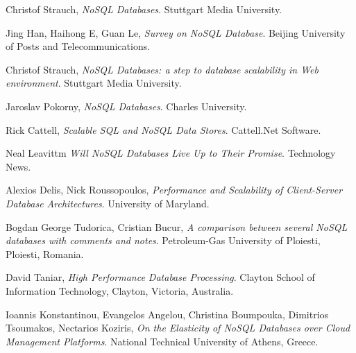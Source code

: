 \documentclass[times, 10pt,twocolumn]{article}
\newcounter{firstbib}
\begin{document}
\begin{thebibliography}{9}  

\setcounter{enumiv}{\value{firstbib}}

  	  Christof Strauch, 
      \emph{NoSQL Databases}. Stuttgart Media University.
      
      
  	  Jing Han, Haihong E, Guan Le,
      \emph{Survey on NoSQL Database}. Beijing University of Posts and Telecommunications.
      
  	  Christof Strauch, 
      \emph{NoSQL Databases: a step to database scalability in Web environment}. Stuttgart Media University.
      
  	   Jaroslav Pokorny, 
      \emph{NoSQL Databases}. Charles University.
      
  	  Rick Cattell, 
      \emph{Scalable SQL and NoSQL Data Stores}. Cattell.Net Software.
      
      
  	  Neal Leavittm 
      \emph{Will NoSQL Databases Live Up to Their Promise}. Technology News.
      
  	  Alexios Delis, Nick Roussopoulos, 
      \emph{Performance and Scalability of Client-Server Database Architectures}. University of Maryland.
      
  	  Bogdan George Tudorica, Cristian Bucur, 
      \emph{A comparison between several NoSQL databases with comments and notes}. Petroleum-Gas University of Ploiesti, Ploiesti, Romania.
      
  	  David Taniar, 
      \emph{High Performance Database Processing}. Clayton School of Information Technology, Clayton, Victoria, Australia.
      
  	  Ioannis Konstantinou, Evangelos Angelou, Christina Boumpouka, Dimitrios Tsoumakos, Nectarios Koziris, 
      \emph{On the Elasticity of NoSQL Databases over Cloud Management Platforms}. National Technical University of Athens, Greece.
      

\end{thebibliography}
\end{document}
